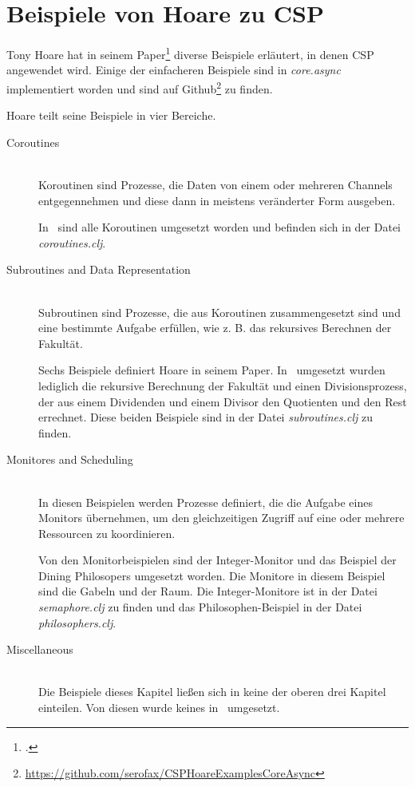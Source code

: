 \section{Beispiele von Hoare zu \acs{CSP}}
Tony Hoare hat in seinem Paper\footcite{CSP} diverse Beispiele erläutert, in denen \ac{CSP} angewendet wird. Einige der einfacheren Beispiele sind in \textit{core.async} implementiert worden und sind auf Github\footnote{\url{https://github.com/serofax/CSPHoareExamplesCoreAsync}} zu finden.

Hoare teilt seine Beispiele in vier Bereiche. 

\begin{description}
\item[Coroutines]\hfill \\
Koroutinen sind Prozesse, die Daten von einem oder mehreren Channels entgegennehmen und diese dann in meistens veränderter Form ausgeben.

In \CA\ sind alle Koroutinen umgesetzt worden und befinden sich in der Datei \textit{coroutines.clj}.
\item[Subroutines and Data Representation]\hfill \\
Subroutinen sind Prozesse, die aus Koroutinen zusammengesetzt sind und eine bestimmte Aufgabe erfüllen, wie z. B. das rekursives Berechnen der Fakultät.

Sechs Beispiele definiert Hoare in seinem Paper. In \CA\ umgesetzt wurden lediglich die rekursive Berechnung der Fakultät und einen Divisionsprozess, der aus einem Dividenden und einem Divisor den Quotienten und den Rest errechnet. Diese beiden Beispiele sind in der Datei \textit{subroutines.clj} zu finden.
\item[Monitores and Scheduling] \hfill \\
In diesen Beispielen werden Prozesse definiert, die die Aufgabe eines Monitors übernehmen, um den gleichzeitigen Zugriff auf eine oder mehrere Ressourcen zu koordinieren.

Von den Monitorbeispielen sind der Integer-Monitor und das Beispiel der Dining Philosopers umgesetzt worden. Die Monitore in diesem Beispiel sind die Gabeln und der Raum. Die Integer-Monitore ist in der Datei \textit{semaphore.clj} zu finden und das Philosophen-Beispiel in der Datei \textit{philosophers.clj}.
\item[Miscellaneous] \hfill \\
Die Beispiele dieses Kapitel ließen sich in keine der oberen drei Kapitel einteilen. Von diesen wurde keines in \CA\ umgesetzt.
\end{description}




